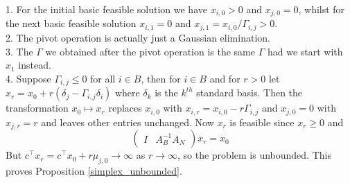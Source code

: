 \begin{remark}
    1. For the initial basic feasible solution we have $x_{i,0}>0$ and $x_{j,0}=0$, whilst for the next basic feasible solution $x_{i,1}=0$ and $x_{j,1}=x_{i,0}/\Gamma_{i,j}>0$.\\
    2. The pivot operation is actually just a Gaussian elimination.\\
    3. The $\Gamma$ we obtained after the pivot operation is the same $\Gamma$ had we start with $x_1$ instead.\\
    4. Suppose $\Gamma_{i,j}\le 0$ for all $i\in B$, then for $i\in B$ and for $r>0$ let $x_r=x_0+r(\delta_j-\Gamma_{i,j}\delta_i)$ where $\delta_k$ is the $k^{th}$ standard basis.
    Then the transformation $x_0\mapsto x_r$ replaces $x_{i,0}$ with $x_{i,r}=x_{i,0}-r\Gamma_{i,j}$ and $x_{j,0}=0$ with $x_{j,r}=r$ and leaves other entries unchanged.
    Now $x_r$ is feasible since $x_r\ge 0$ and
    $$\begin{pmatrix}
        I&A_B^{-1}A_N
    \end{pmatrix}x_r=x_0$$
    But $c^\top x_r=c^\top x_0+r\mu_{j,0}\to\infty$ as $r\to\infty$, so the problem is unbounded.
    This proves Proposition \ref{simplex_unbounded}.
\end{remark}

